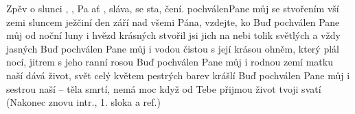 \begin{TEXT}{Zpěv o slunci}
\SLOKA[Intr.] , ,  Pa\NL
ať  , sláva,  se sta,\NL
{} čení.\NL
\SLOKA {} pochválenPane můj\NL
se  stvořením  vší zemi\NL        
{} sluncem ježčiní den\NL
{} září nad  všemi\NL
\REFREN {} Pána,  vzdejte,  ko
\SLOKA Buď pochválen Pane můj\NL
od noční luny i hvězd krásných\NL
stvořil jsi jich na nebi\NL
tolik světlých a vždy jasných\NL
\SLOKA Buď pochválen Pane můj\NL
i vodou čistou s její krásou\NL
ohněm, který plál nocí,\NL
jitrem s jeho ranní rosou\NL
\SLOKA Buď pochválen Pane můj\NL
i rodnou zemí matku naší\NL
dává život, svět celý\NL
květem pestrých barev krášlí\NL
\SLOKA Buď pochválen Pane můj\NL
i sestrou naší – těla smrtí,\NL
nemá moc když od Tebe\NL
přijmou život tvoji svatí\NL
\SLOKA* (Nakonec znovu intr., 1. sloka a ref.) 
\end{TEXT}